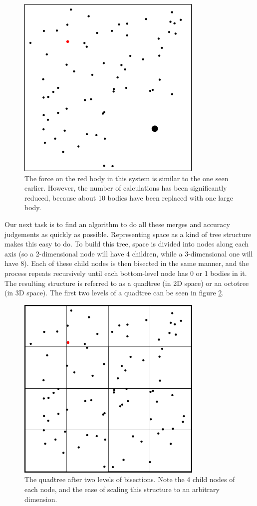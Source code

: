\documentclass[thesis.tex]{subfiles}
\begin{document}
\begin{figure}[p]
	\includegraphics{imgs/treecode-merged}
	\caption{The force on the red body in this system is similar to the one seen earlier. However, the number of calculations has been significantly reduced, because about 10 bodies have been replaced with one large body.}
	\label{treecode-merged}
\end{figure}

Our next task is to find an algorithm to do all these merges and accuracy judgements as quickly as possible. Representing space as a kind of tree structure makes this easy to do. To build this tree, space is divided into nodes along each axis (so a 2-dimensional node will have 4 children, while a 3-dimensional one will have 8). Each of these child nodes is then bisected in the same manner, and the process repeats recursively until each bottom-level node has 0 or 1 bodies in it. The resulting structure is referred to as a quadtree (in 2D space) or an octotree (in 3D space). The first two levels of a quadtree can be seen in figure \ref{treecode-nodelev2}.

\begin{figure}[p]
	\includegraphics{imgs/treecode-nodelev2}
	\caption{The quadtree after two levels of bisections. Note the 4 child nodes of each node, and the ease of scaling this structure to an arbitrary dimension.}
	\label{treecode-nodelev2}
\end{figure}
\end{document}
